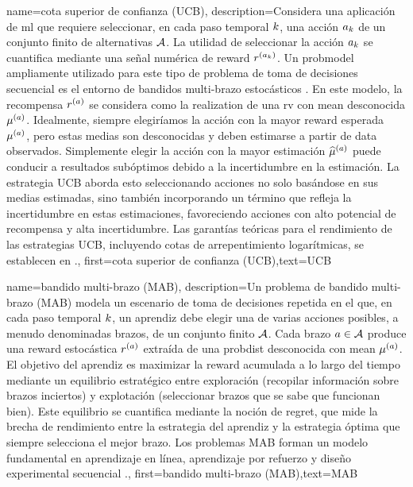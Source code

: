 {name={cota superior de confianza (UCB)},
	description={Considera  una aplicación de \gls{ml} 
	que requiere seleccionar, en cada paso temporal $k$, una acción $a_{k}$ 
	de un conjunto finito de alternativas $\mathcal{A}$. La utilidad de seleccionar la acción $a_{k}$ 
	se cuantifica mediante una señal numérica de \gls{reward} $r^{(a_{k})}$. 
	Un \gls{probmodel} ampliamente utilizado para este tipo de problema de toma de decisiones secuencial 
	es el entorno de bandidos multi-brazo estocásticos \cite{Bubeck2012}. En este modelo, 
	la recompensa $r^{(a)}$ se considera como la \gls{realization} de una \gls{rv} 
	con \gls{mean} desconocida $\mu^{(a)}$. Idealmente, siempre elegiríamos la 
	acción con la mayor \gls{reward} esperada $\mu^{(a)}$, pero estas 
	medias son desconocidas y deben estimarse a partir de \gls{data} observados. Simplemente 
	elegir la acción con la mayor estimación $\widehat{\mu}^{(a)}$ puede 
	conducir a resultados subóptimos debido a la incertidumbre en la estimación. La estrategia UCB 
	aborda esto seleccionando acciones no solo basándose en sus medias estimadas, sino 
	también incorporando un término que refleja la incertidumbre en estas estimaciones, favoreciendo 
	acciones con alto potencial de recompensa y alta incertidumbre. Las garantías teóricas 
	para el rendimiento de las estrategias UCB, incluyendo cotas de arrepentimiento logarítmicas, se establecen en \cite{Bubeck2012}.},
	first={cota superior de confianza (UCB)},text={UCB} 
}

{name={bandido multi-brazo (MAB)},
	description={Un problema de bandido multi-brazo (MAB)  modela 
	un escenario de toma de decisiones repetida en el que, en cada paso temporal $k$, un aprendiz debe 
	elegir una de varias acciones posibles, a menudo denominadas brazos, de un conjunto finito 
	$\mathcal{A}$. Cada brazo $a \in \mathcal{A}$ produce una \gls{reward} estocástica $r^{(a)}$ 
	extraída de una \gls{probdist} desconocida con \gls{mean} $\mu^{(a)}$. 
	El objetivo del aprendiz es maximizar la \gls{reward} acumulada a lo largo del tiempo mediante 
	un equilibrio estratégico entre exploración (recopilar información sobre 
	brazos inciertos) y explotación (seleccionar brazos que se sabe que funcionan bien). 
	Este equilibrio se cuantifica mediante la noción de \gls{regret}, que mide la brecha de rendimiento 
	entre la estrategia del aprendiz y la estrategia óptima que siempre selecciona el mejor brazo. 
	Los problemas MAB forman un modelo fundamental en aprendizaje en línea, aprendizaje por refuerzo 
	y diseño experimental secuencial \cite{Bubeck2012}.},
	first={bandido multi-brazo (MAB)},text={MAB}
}



